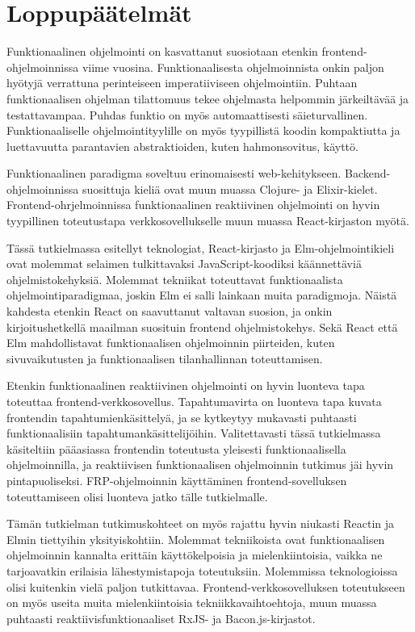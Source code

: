 \chapter{Loppupäätelmät}
Funktionaalinen ohjelmointi on kasvattanut suosiotaan etenkin frontend-ohjelmoin\-nis\-sa viime vuosina.
Funktionaalisesta ohjelmoinnista onkin paljon hyötyjä verrattuna perinteiseen imperatiiviseen ohjelmointiin. Puhtaan
funktionaalisen ohjelman tilattomuus tekee ohjelmasta helpommin järkeiltävää ja testattavampaa. Puhdas funktio on myös
automaattisesti säieturvallinen. Funktionaaliselle ohjelmointityylille on myös tyypillistä koodin kompaktiutta ja
luettavuutta parantavien abstraktioiden, kuten hahmonsovitus, käyttö.

Funktionaalinen paradigma soveltuu erinomaisesti web-kehitykseen. Backend-ohjelmoinnissa suosittuja kieliä ovat muun
muassa Clojure- ja Elixir-kielet. Frontend-ohrjelmoinnissa funktionaalinen reaktiivinen ohjelmointi on hyvin tyypillinen
toteutustapa verkkosovellukselle muun muassa React-kirjaston myötä.

Tässä tutkielmassa esitellyt teknologiat, React-kirjasto ja Elm-ohjelmointikieli ovat molemmat selaimen tulkittavaksi
JavaScript-koodiksi käännettäviä ohjelmistokehyksiä. Molemmat tekniikat toteuttavat funktionaalista
ohjelmointiparadigmaa, joskin Elm ei salli lainkaan muita paradigmoja. Näistä kahdesta etenkin React on saavuttanut
valtavan suosion, ja onkin kirjoitushetkellä maailman suosituin frontend ohjelmistokehys. Sekä React että Elm
mahdollistavat funktionaalisen ohjelmoinnin piirteiden, kuten sivuvaikutusten ja funktionaalisen tilanhallinnan
toteuttamisen.

Etenkin funktionaalinen reaktiivinen ohjelmointi on hyvin luonteva tapa toteuttaa frontend-verkkosovellus.
Tapahtumavirta on luonteva tapa kuvata frontendin tapahtumienkäsittelyä, ja se kytkeytyy mukavasti puhtaasti
funktionaalisiin tapahtumankäsittelijöihin. Valitettavasti tässä tutkielmassa käsiteltiin pääasiassa frontendin
toteutusta yleisesti funktionaalisella ohjelmoinnilla, ja reaktiivisen funktionaalisen ohjelmoinnin tutkimus jäi hyvin
pintapuoliseksi. FRP-ohjelmoinnin käyttäminen frontend-sovelluksen toteuttamiseen olisi luonteva jatko tälle
tutkielmalle.

Tämän tutkielman tutkimuskohteet on myös rajattu hyvin niukasti Reactin ja Elmin tiettyihin yksityiskohtiin. Molemmat
tekniikoista ovat funktionaalisen ohjelmoinnin kannalta erittäin käyttökelpoisia ja mielenkiintoisia, vaikka ne
tarjoavatkin erilaisia lähestymistapoja toteutuksiin. Molemmissa teknologioissa olisi kuitenkin vielä paljon
tutkittavaa. Frontend-verkkosovelluksen toteutukseen on myös useita muita mielenkiintoisia tekniikkavaihtoehtoja, muun
muassa puhtaasti reaktiivisfunktionaaliset RxJS- ja Bacon.js-kirjastot.
